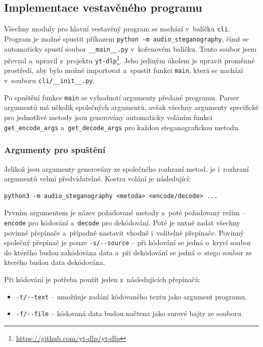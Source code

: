 \subsection*{Implementace vestavěného programu}
\label{sub:tui-implementation}

Všechny moduly pro hlavní vestavěný program se nachází v~balíčku \texttt{cli}.
Program je možné spustit příkazem \texttt{python -m audio\_steganography}, čímž
se automaticky spustí soubor \texttt{\_\_main\_\_.py} v~kořenovém balíčku.
Tento soubor jsem převzal a~upravil z~projektu
\texttt{yt-dlp}\footnote{\url{https://github.com/yt-dlp/yt-dlp}}. Jeho jediným
úkolem je upravit proměnné prostředí, aby bylo možné importovat a~spustit
funkci \texttt{main}, která se nachází v~souboru \texttt{cli/\_\_init\_\_.py}.

Po spuštění funkce \texttt{main} se vyhodnotí argumenty předané programu.
Parser argumentů má několik společných argumentů, avšak všechny argumenty
specifické pro jednotlivé metody jsou generovány automaticky voláním funkcí
\texttt{get\_encode\_args} a~\texttt{get\_decode\_args} pro každou
steganografickou metodu.

\subsubsection*{Argumenty pro spuštění}
\label{ssub:tui-arguments}

Jelikož jsou argumenty generovány ze společného rozhraní metod, je i~rozhraní
argumentů velmi předvídatelné. Kostra volání je následující:

\begin{verbatim}
python3 -m audio_steganography <metoda> <encode/decode> ...
\end{verbatim}

Prvním argumentem je název požadované metody a~poté požadovaný režim --
\texttt{encode} pro kódování a~\texttt{decode} pro dekódování. Poté je nutné
zadat všechny povinné přepínače a~případně nastavit vhodně i~volitelné
přepínače. Povinný společný přepínač je pouze \verb|-s/--source| -- při
kódování se jedná o~krycí soubor do kterého budou zakódována data a~při
dekódování se jedná o~stego soubor ze kterého budou data dekódována.

Při kódování je potřeba použít jeden z~následujících přepínačů:

\begin{itemize}
    \item \verb|-t/--text| -- umožňuje zadání kódovaného textu jako argument
        programu,
    \item \verb|-f/--file| -- kódovaná data budou načtena jako surové bajty ze
        souboru.
\end{itemize}

